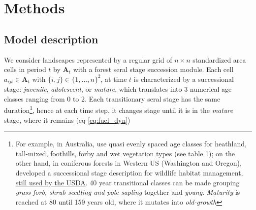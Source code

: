 \section{Methods}
\label{section:methods}
\subsection{Model description}

We consider landscapes represented by a regular grid of $n\times n$ standardized area cells in period $t$ by $\mathbf{A}_t$ with a forest seral stage succession module. 
Each cell $a_{ijt} \in \mathbf{A}_t$ with $\{i,j\} \in \{1, ...,n\}^2$, at time $t$ is characterized by a successional stage: \textit{juvenile}, \textit{adolescent}, or \textit{mature}, which translates into 3 numerical age classes ranging from 0 to 2. 
Each transitionary seral stage has the same duration\footnote{For example, in Australia, \cite{mccoll_gausden_pathways_2019} use quasi evenly spaced age classes for heathland, tall-mixed, foothills, forby and wet vegetation types (see table 1); on the other hand, in coniferous forests in Western US (Washington and Oregon),\cite{thomas_wildlife_1979} developed a successional stage description for wildlife habitat management, \href{https://www.fs.usda.gov/Internet/FSE_DOCUMENTS/stelprdb5413728.pdf}{still used by the USDA}. 40 year transitional classes can be made grouping \textit{grass-forb, shrub-seedling and pole-sapling} together and \textit{young}. \textit{Maturity} is reached at 80 until 159 years old, where it mutates into \textit{old-growth}}, hence at each time step, it changes stage until it is in the \textit{mature} stage, where it remains (eq \ref{eq:fuel_dyn})

